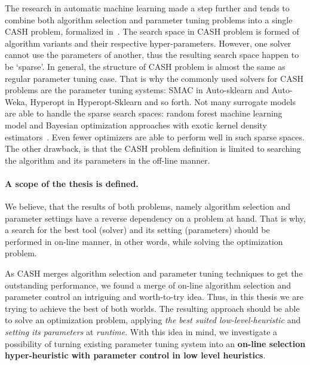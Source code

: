 The research in automatic machine learning made a step further and tends to combine both algorithm selection and parameter tuning problems into a single CASH problem, formalized in~\cite{thornton2013auto}. The search space in CASH problem is formed of algorithm variants and their respective hyper-parameters. However, one solver cannot use the parameters of another, thus the resulting search space happen to be `sparse'. In general, the structure of CASH problem is almost the same as regular parameter tuning case. That is why the commonly used solvers for CASH problems are the parameter tuning systems: SMAC in Auto-sklearn and Auto-Weka, Hyperopt in Hyperopt-Sklearn and so forth.
Not many surrogate models are able to handle the sparse search spaces: random forest machine learning model and Bayesian optimization approaches with exotic kernel density estimators~\cite{levesque2017bayesian}. Even fewer optimizers are able to perform well in such sparse spaces.
The other drawback, is that the CASH problem definition is limited to searching the algorithm and its parameters in the off-line manner.

\paragraph{A scope of the thesis is defined.}

We believe, that the results of both problems, namely algorithm selection and parameter settings have a reverse dependency on a problem at hand.
That is why, a search for the best tool (solver) and its setting (parameters) should be performed in on-line manner, in other words, while solving the optimization problem.

As CASH merges algorithm selection and parameter tuning techniques to get the outstanding performance, we found a merge of on-line algorithm selection and parameter control an intriguing and worth-to-try idea. 
Thus, in this thesis we are trying to achieve the best of both worlds. The resulting approach should be able to solve an optimization problem, applying \emph{the best suited low-level-heuristic} and \emph{setting its parameters} at \emph{runtime}. With this idea in mind, we investigate a possibility of turning existing parameter tuning system into an \textbf{on-line selection hyper-heuristic with parameter control in low level heuristics}.
